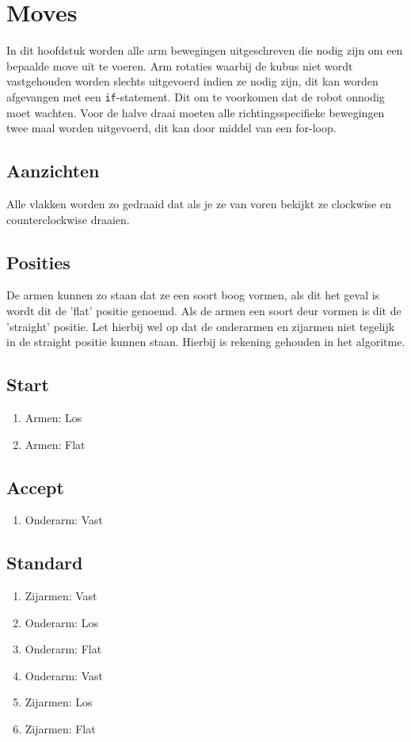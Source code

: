 \section{Moves}
In dit hoofdstuk worden alle arm bewegingen uitgeschreven die nodig zijn om een
bepaalde move uit te voeren. Arm rotaties waarbij de kubus niet wordt
vastgehouden worden slechts uitgevoerd indien ze nodig zijn, dit kan worden
afgevangen met een \texttt{if}-statement. Dit om te voorkomen dat de robot
onnodig moet wachten. Voor de halve draai moeten alle richtingsspecifieke
bewegingen twee maal worden uitgevoerd, dit kan door middel van een for-loop.

\subsection{Aanzichten}
Alle vlakken worden zo gedraaid dat als je ze van voren bekijkt ze clockwise en
counterclockwise draaien.

\subsection{Posities}
De armen kunnen zo staan dat ze een soort boog vormen, als dit het geval is wordt
dit de 'flat' positie genoemd. Als de armen een soort deur vormen is dit de
'straight' positie. Let hierbij wel op dat de onderarmen en zijarmen niet
tegelijk in de straight positie kunnen staan. Hierbij is rekening gehouden in
het algoritme.



\subsection{Start}
\begin{enumerate}
	\item Armen: Los
	\item Armen: Flat
\end{enumerate}

\subsection{Accept}
\begin{enumerate}
	\item Onderarm: Vast
\end{enumerate}

\subsection{Standard}
\begin{enumerate}
	\item Zijarmen: Vast
	\item Onderarm: Los
	\item Onderarm: Flat
	\item Onderarm: Vast
	\item Zijarmen: Los
	\item Zijarmen: Flat
\end{enumerate}
\newpage


